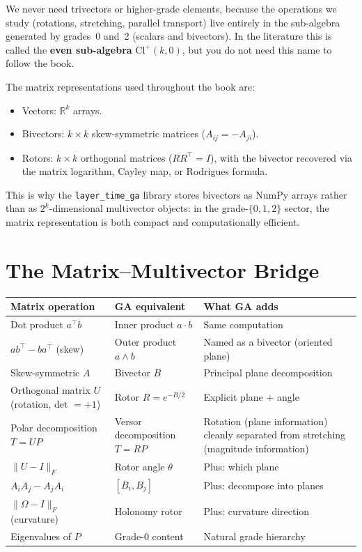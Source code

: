 \documentclass[11pt, twoside, openright]{memoir}
\newcommand{\ip}{\cdot}           %
\newcommand{\op}{\wedge}          %
\numberwithin{equation}{chapter}
\begin{document}
We never need trivectors or higher-grade elements, because the
operations we study (rotations, stretching, parallel transport) live entirely in the sub-algebra generated by grades~0 and~2 (scalars and bivectors). In the literature this is called the \textbf{even sub-algebra} $\mathrm{Cl}^+(k,0)$, but you do not need this name to follow the book.

The matrix representations used throughout the book are:
\begin{itemize}[nosep]
\item Vectors: $\mathbb{R}^k$ arrays.
\item Bivectors: $k \times k$ skew-symmetric matrices
  ($A_{ij} = -A_{ji}$).
\item Rotors: $k \times k$ orthogonal matrices ($R R^\top = I$),
  with the bivector recovered via the matrix logarithm, Cayley map,
  or Rodrigues formula.
\end{itemize}

This is why the \texttt{layer\_time\_ga} library stores bivectors as
NumPy arrays rather than as $2^k$-dimensional multivector objects:
in the grade-$\{0, 1, 2\}$ sector, the matrix representation is both
compact and computationally efficient.


\chapter{The Matrix--Multivector Bridge}
\label{app:bridge}

\begin{center}
\renewcommand{\arraystretch}{1.5}\small
\begin{tabularx}{\textwidth}{@{}l l X@{}}
\toprule
\textbf{Matrix operation} & \textbf{GA equivalent} & \textbf{What GA adds} \\
\midrule
Dot product $a^\top b$ & Inner product $a \ip b$ &
  Same computation \\
$ab^\top - ba^\top$ (skew) & Outer product $a \op b$ &
  Named as a bivector (oriented plane) \\
Skew-symmetric $A$ & Bivector $B$ &
  Principal plane decomposition \\
Orthogonal matrix $U$ (rotation, det $= +1$) & Rotor $R = e^{-B/2}$ &
  Explicit plane + angle \\
Polar decomposition $T = UP$ & Versor decomposition $T = RP$ &
  Rotation (plane information) cleanly separated from stretching (magnitude information) \\
$\|U - I\|_F$ & Rotor angle $\theta$ &
  Plus: which plane \\
$A_i A_j - A_j A_i$ & $[B_i, B_j]$ &
  Plus: decompose into planes \\
$\|\Omega - I\|_F$ (curvature) & Holonomy rotor &
  Plus: curvature direction \\
Eigenvalues of $P$ & Grade-0 content &
  Natural grade hierarchy \\
\bottomrule
\end{tabularx}
\end{center}
\end{document}
